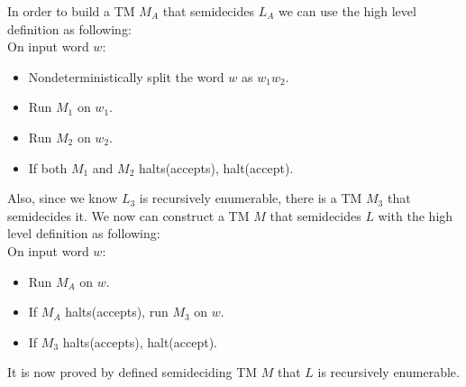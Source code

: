 \documentclass[12pt]{article}
\begin{document}
  \qquad In order to build a TM $M_A$ that semidecides $L_A$ we can use the high level definition as following:\\

  \qquad On input word $w$:
  \begin{itemize}
    \item Nondeterministically split the word $w$ as $w_1w_2$.
    \item Run $M_1$ on $w_1$.
    \item Run $M_2$ on $w_2$.
    \item If both $M_1$ and $M_2$ halts(accepts), halt(accept).
  \end{itemize}

  \qquad Also, since we know $L_3$ is recursively enumerable, there is a TM $M_3$ that semidecides it. We now can construct a TM $M$ that semidecides $L$ with the high level definition as following:\\

  \qquad On input word $w$:
  \begin{itemize}
    \item Run $M_A$ on $w$.
    \item If $M_A$ halts(accepts), run $M_3$ on $w$.
    \item If $M_3$ halts(accepts), halt(accept).
  \end{itemize}

  \qquad It is now proved by defined semideciding TM $M$ that $L$ is recursively enumerable.
\end{document}
